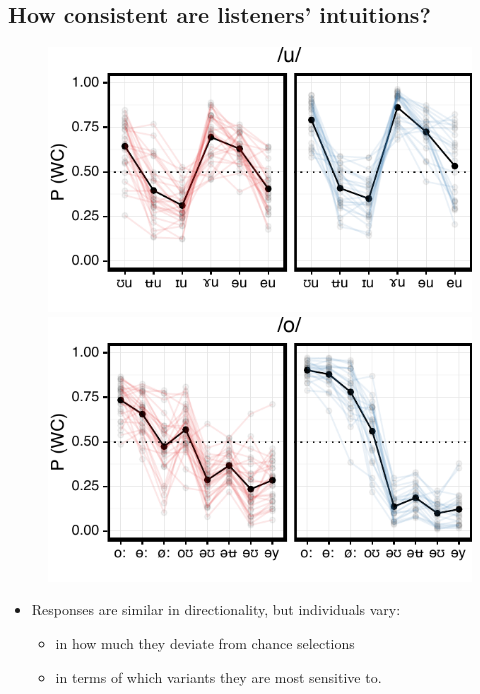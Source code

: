 \documentclass[a0,portrait]{a0poster}
\begin{document}
\begin{multicols}{4}
\subsection*{How consistent are listeners' intuitions?}
\begin{figure}[H]
\centering
\includegraphics[scale=1.95]{u_clust.pdf}
\includegraphics[scale=1.95]{o_clust.pdf}
\end{figure}
\vspace*{-1cm}
\begin{itemize}
\item{Responses are similar in directionality, but individuals vary:\begin{itemize}\item{in how much they deviate from chance selections} \item{in terms of which variants they are most sensitive to.}\end{itemize}}

\end{itemize}
\end{multicols}
\end{document}
